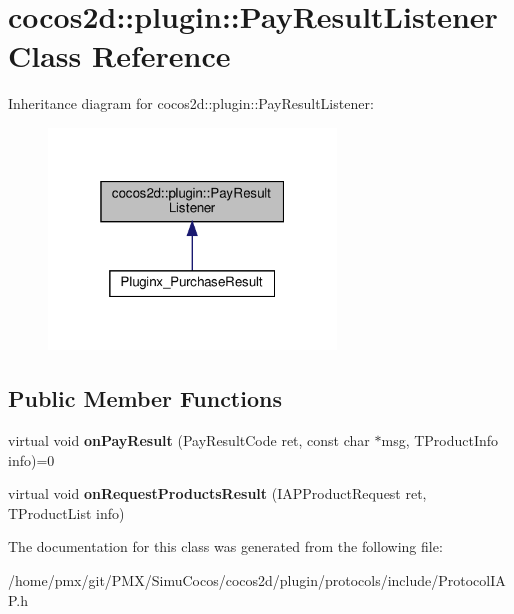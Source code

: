 \hypertarget{classcocos2d_1_1plugin_1_1PayResultListener}{}\section{cocos2d\+:\+:plugin\+:\+:Pay\+Result\+Listener Class Reference}
\label{classcocos2d_1_1plugin_1_1PayResultListener}


Inheritance diagram for cocos2d\+:\+:plugin\+:\+:Pay\+Result\+Listener\+:
\nopagebreak
\begin{figure}[H]
\begin{center}
\leavevmode
\includegraphics[width=217pt]{classcocos2d_1_1plugin_1_1PayResultListener__inherit__graph}
\end{center}
\end{figure}
\subsection*{Public Member Functions}
\begin{DoxyCompactItemize}
\item 
\mbox{\label{classcocos2d_1_1plugin_1_1PayResultListener_a236dbfc64a58d5b81589b9651df67445}} 
virtual void {\bfseries on\+Pay\+Result} (Pay\+Result\+Code ret, const char $\ast$msg, T\+Product\+Info info)=0
\item 
\mbox{\label{classcocos2d_1_1plugin_1_1PayResultListener_ac833df8c37ddcf5f86e2663d66c2fb09}} 
virtual void {\bfseries on\+Request\+Products\+Result} (I\+A\+P\+Product\+Request ret, T\+Product\+List info)
\end{DoxyCompactItemize}


The documentation for this class was generated from the following file\+:\begin{DoxyCompactItemize}
\item 
/home/pmx/git/\+P\+M\+X/\+Simu\+Cocos/cocos2d/plugin/protocols/include/Protocol\+I\+A\+P.\+h\end{DoxyCompactItemize}
